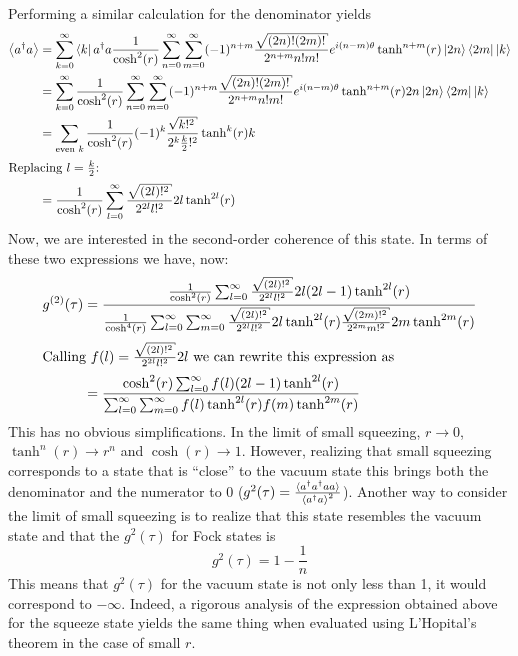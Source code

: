 \begin{homeworkProblem}
    Performing a similar calculation for the denominator yields
    \begin{align}
        \Braket{a^\dagger a}
        &= \sum_{k=0}^\infty \bra{k}
        a^\dagger a
        \frac{1}{\cosh^2(r)} \sum_{n=0}^{\infty}\sum^{\infty}_{m=0}
        (-1)^{n+m}
        \frac{\sqrt{(2n)!(2m)!}}{2^{n+m} n! m!} e^{i (n-m) \theta} \tanh^{n+m}(r)
        \ket{2n} \bra{2m}
        \ket{k} \\
        &= \sum_{k=0}^\infty
        \frac{1}{\cosh^2(r)} \sum_{n=0}^{\infty}\sum^{\infty}_{m=0}
        (-1)^{n+m}
        \frac{\sqrt{(2n)!(2m)!}}{2^{n+m} n! m!} e^{i (n-m) \theta} \tanh^{n+m}(r)
        2n \ket{2n} \bra{2m}
        \ket{k} \\
        &= \sum_{\textrm{even $ k $}}
        \frac{1}{\cosh^2(r)}
        (-1)^{k}
        \frac{\sqrt{k!^2}}{2^{k} \frac{k}{2}!^2} \tanh^{k}(r)
        k \\
        \intertext{Replacing $ l = \frac{k}{2} $:}
        &= \frac{1}{\cosh^2(r)}
        \sum_{l=0}^\infty
        \frac{\sqrt{(2l)!^2}}{2^{2 l} l!^2} 2l \tanh^{2 l}(r) \\
    \end{align}
    Now, we are interested in the second-order coherence of this state. In terms
    of these two expressions we have, now:
    \begin{align}
        g^{(2)}(\tau) &= \frac{\frac{1}{\cosh^2(r)}
            \sum_{l=0}^\infty \frac{\sqrt{(2l)!^2}}{2^{2l} l!^2} 2l(2l-1)
            \tanh^{2l}(r)}{\frac{1}{\cosh^4(r)}
            \sum_{l=0}^\infty
            \sum_{m=0}^\infty
            \frac{\sqrt{(2l)!^2}}{2^{2 l} l!^2} 2l \tanh^{2 l}(r)
        \frac{\sqrt{(2m)!^2}}{2^{2 m} m!^2} 2m \tanh^{2 m}(r) } \\
        \intertext{Calling $ f(l) = \frac{\sqrt{(2l)!^2}}{2^{2l} l!^2} 2l $
        we can rewrite this expression as}
        &= \frac{ \cosh^2(r)
        \sum_{l=0}^\infty f(l) (2l-1)
            \tanh^{2l}(r)}{
            \sum_{l=0}^\infty
            \sum_{m=0}^\infty
            f(l) \tanh^{2 l}(r) f(m) \tanh^{2 m}(r) } \\
    \end{align}
    This has no obvious simplifications. In the limit of small squeezing, $ r
    \to 0 $, $ \tanh^n(r) \to r^n $ and $ \cosh(r) \to 1 $. However, realizing
    that small squeezing corresponds to a state that is ``close'' to the vacuum
    state this brings both the denominator and the numerator to 0 ($ g^{2}(\tau)
    = \frac{\braket{a^\dagger a^\dagger a a}}{\braket{a^\dagger a}^2} $).
    Another way to consider the limit of small squeezing is to realize that this
    state resembles the vacuum state and that the $ g^2(\tau) $ for Fock states
    is
    \[
        g^2(\tau) = 1 - \frac{1}{n}
    \]
    This means that $ g^2(\tau) $ for the vacuum state is not only less than 1,
    it would correspond to $ -\infty $. Indeed, a rigorous analysis of the
    expression obtained above for the squeeze state yields the same thing when
    evaluated using L'Hopital's theorem in the case of small $ r $.


\end{homeworkProblem}
